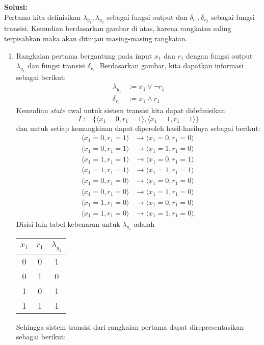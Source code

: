 \documentclass[a4paper]{article}
\theoremstyle{definition}
\begin{document}
\noindent \textbf{Solusi:}\\
Pertama kita definisikan $\lambda_{y_1}, \lambda_{y_2}$ sebagai fungsi output dan $\delta_{r_1}, \delta_{r_2}$ sebagai fungsi transisi. Kemudian berdasarkan gambar di atas, karena rangkaian saling terpisahkan maka akan ditinjau masing-masing rangkaian.
\begin{enumerate}[label=(\arabic*)]
  \item Rangkaian pertama bergantung pada input $x_1$ dan $r_1$ dengan fungsi output $\lambda_{y_1}$ dan fungsi transisi $\delta_{r_1}$. Berdasarkan gambar, kita dapatkan informasi sebagai berikut:
  \begin{align*}
    \lambda_{y_1} &:= x_1 \lor \lnot r_1 \\
    \delta_{r_1} &:= x_1 \land r_1
  \end{align*}
  Kemudian \textit{state} awal untuk sistem transisi kita dapat didefinisikan 
  \[I:=\{\langle x_1=0, r_1=1 \rangle, \langle x_1=1, r_1=1 \rangle\}\]
  dan untuk setiap kemungkinan dapat diperoleh hasil-hasilnya sebagai berikut:
  \begin{align*}
    \langle x_1=0, r_1=1 \rangle &\longrightarrow \langle x_1=0, r_1=0 \rangle\\
    \langle x_1=0, r_1=1 \rangle &\longrightarrow \langle x_1=1, r_1=0 \rangle\\
    \langle x_1=1, r_1=1 \rangle &\longrightarrow \langle x_1=0, r_1=1 \rangle\\
    \langle x_1=1, r_1=1 \rangle &\longrightarrow \langle x_1=1, r_1=1 \rangle\\
    \langle x_1=0, r_1=0 \rangle &\longrightarrow \langle x_1=0, r_1=0 \rangle\\
    \langle x_1=0, r_1=0 \rangle &\longrightarrow \langle x_1=1, r_1=0 \rangle\\
    \langle x_1=1, r_1=0 \rangle &\longrightarrow \langle x_1=0, r_1=0 \rangle\\
    \langle x_1=1, r_1=0 \rangle &\longrightarrow \langle x_1=1, r_1=0 \rangle.
  \end{align*}
  Disisi lain tabel kebenaran untuk $\lambda_{y_1}$ adalah
  \begin{center}
    \begin{tabular}{|c|c|c|}
      \hline
      $x_1$ & $r_1$ & $\lambda_{y_1}$\\
      \hline
      0 & 0 & 1\\
      0 & 1 & 0\\
      1 & 0 & 1\\
      1 & 1 & 1\\
      \hline
    \end{tabular}
  \end{center}
  Sehingga sistem transisi dari rangkaian pertama dapat direpresentasikan sebagai berikut:
  \begin{center}
    \begin{tikzpicture}[
      ->, >=stealth, node distance=2.5cm, on grid, thick,initial text=,
      state/.style={rectangle, rounded corners, draw, minimum width=2.0cm, minimum height=1cm},
      every loop/.style={looseness=3}]
  

\end{tikzpicture}
\end{center}
\end{enumerate}
\end{document}
